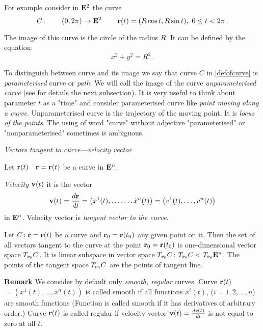 \documentclass[12pt]{article}
\numberwithin{equation}{section}
\begin{document}
   For example consider in ${\bf E}^2$ the curve
\begin{equation*}\label{exofcurve}
  C\colon\qquad (0,2\pi)\rightarrow {\bf E}^2\:\qquad {\bf r}(t)=(R\cos t,R\sin t),\,\,
  0\leq t<2\pi\,.
\end{equation*}

The image of this curve is the circle  of the radius $R$. It can be defined by the
equation:
\begin{equation*}\label{defofcurvebyequation}
  x^2+y^2=R^2\,.
\end{equation*}

To distinguish between curve and its image we say that curve $C$ in
\eqref{defofcurve} is {\it parameterised}
 curve  or {\it path}.
  We will call  the image of the curve {\it unparameterised curve}
   (see for details the next subsection).
  It is very useful to think about parameter $t$ as a "time" and consider
  parameterised curve like {\it point moving along a curve}.
  Unparameterised curve is the trajectory of the moving point.
It is {\it locus of the points}.
The using of word "curve" without adjective "parameterised" 
or "nonparameterised"
   sometimes is ambiguous.


\m

{\it Vectors tangent to curve---velocity vector}

\m

 Let ${\bf r}(t)\quad{\bf r}={\bf r}(t)$ be a curve in ${\bf E}^n$.

 {\it Velocity ${\bf v}(t)$} it is the vector
\begin{equation*}\label{tangentvector}
 {\bf v}(t)={d{\bf r} \over dt}=\left(\dot x^1(t),\dots,\dots \dot x^n(t)\right)=
 \left(v^1(t),\dots,v^n(t)\right)
\end{equation*}
  in ${\bf E}^n$.  Velocity vector is {\it tangent vector
 to the curve}.



  Let $C\colon {\bf r}={\bf r}(t)$ be  a curve
 and ${\bf r}_0={\bf r}(t_0)$ any given point on it.  Then
   the set of all vectors tangent to the curve at the  
point ${\bf r}_0={\bf r}(t_0)$ is one-dimensional  vector space
 $T_{{\bf r}_0}C$. It is linear subspace in vector space $T_{{\bf r}_0}C$:
 $T_{{\bf r}_0}C< T_{{\bf r}_0}{\bf E}^n$.
 The points of the tangent space  $T_{{\bf r}_0}C$ are the points of tangent line.


{\bf Remark}
  We consider by default only {\it smooth, regular} curves.
  Curve ${\bf r}(t)$ $=(x^1(t),\dots,x^n(t))$ is called smooth
  if all functions $x^i(t)$, ($i=1,2,\dots,n$) are smooth functions
  (Function is called smooth if it has derivatives of arbitrary order.)
   Curve ${\bf r}(t)$ is called regular if velocity vector 
${\bf v}(t)={d{\bf r}(t)\over dt}$ is not equal to zero at all $t$.
\end{document}
